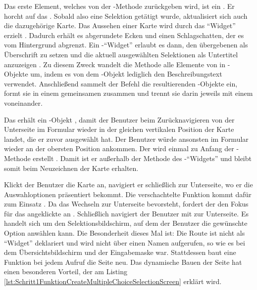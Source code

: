 Das erste Element, welches von der -Methode zurückgeben wird, ist ein  .
Er horcht auf das  .
Sobald also eine Selektion getätigt wurde, aktualisiert sich auch die dazugehörige Karte.
Das Aussehen einer Karte wird durch das \enquote{Widget}  erzielt .
Dadurch erhält es abgerundete Ecken und einen Schlagschatten, der es vom Hintergrund abgrenzt.
Ein -\enquote{Widget} erlaubt es dann, den übergebenen  als Überschrift zu setzen  und die aktuell ausgewählten Selektionen als Untertitel anzuzeigen .
Zu diesem Zweck wandelt die Methode  alle Elemente von  in -Objekte um, indem es von dem -Objekt lediglich den Beschreibungstext  verwendet.
Anschließend sammelt der Befehl  die resultierenden -Objekte ein, formt sie in einem gemeinsamen  zusammen und trennt sie darin jeweils mit einem  voneinander.



Das  erhält ein -Objekt , damit der Benutzer beim Zurücknavigieren von der Unterseite im Formular wieder in der gleichen vertikalen Position der Karte landet, die er zuvor ausgewählt hat.
Der Benutzer würde ansonsten im Formular wieder an der obersten Position ankommen.
Der  wird einmal zu Anfang der -Methode erstellt .
Damit ist er außerhalb der Methode  des -\enquote{Widgets} und bleibt somit beim Neuzeichnen der Karte erhalten.


Klickt der Benutzer die Karte an, navigiert er schließlich zur Unterseite, wo er die Auswahloptionen präsentiert bekommt.
Die verschachtelte Funktion  kommt dafür zum Einsatz .
Da das Wechseln zur Unterseite bevorsteht, fordert der  den Fokus für das angeklickte  an .
Schließlich navigiert der Benutzer mit  zur Unterseite.
Es handelt sich um den Selektionsbildschirm, auf dem der Benutzer die gewünschte Option anwählen kann.
Die Besonderheit dieses Mal ist: Die Route ist nicht als \enquote{Widget} deklariert und wird nicht über einen Namen aufgerufen, so wie es bei dem Übersichtsbildschirm und der Eingabemaske war.
Stattdessen baut eine Funktion bei jedem Aufruf die Seite neu.
Das dynamische Bauen der Seite hat einen besonderen Vorteil, der am Listing \ref{lst:Schritt1FunktionCreateMultipleChoiceSelectionScreen} erklärt wird.


